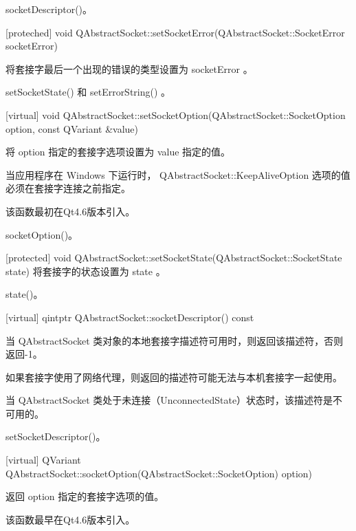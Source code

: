 \begin{notice}[另请查阅]
socketDescriptor()。
\end{notice}


[proteched] void
QAbstractSocket::setSocketError(QAbstractSocket::SocketError
socketError)

将套接字最后一个出现的错误的类型设置为 socketError 。


\begin{notice}[另请查阅]
setSocketState() 和 setErrorString() 。
\end{notice}

[virtual] void
QAbstractSocket::setSocketOption(QAbstractSocket::SocketOption option,
const QVariant \&value)

将 option 指定的套接字选项设置为 value 指定的值。

\begin{notice}
当应用程序在 Windows 下运行时， QAbstractSocket::KeepAliveOption 选项的值必须在套接字连接之前指定。
\end{notice}

该函数最初在Qt4.6版本引入。


\begin{notice}[另请查阅]
socketOption()。
\end{notice}

[protected] void QAbstractSocket::setSocketState(QAbstractSocket::SocketState state)
将套接字的状态设置为 state 。


\begin{notice}[另请查阅]
state()。
\end{notice}

[virtual] qintptr QAbstractSocket::socketDescriptor() const

当 QAbstractSocket 类对象的本地套接字描述符可用时，则返回该描述符，否则返回-1。

如果套接字使用了网络代理，则返回的描述符可能无法与本机套接字一起使用。

当 QAbstractSocket 类处于未连接（UnconnectedState）状态时，该描述符是不可用的。


\begin{notice}[另请查阅]
setSocketDescriptor()。
\end{notice}


[virtual] QVariant
QAbstractSocket::socketOption(QAbstractSocket::SocketOption) option)

返回 option 指定的套接字选项的值。

该函数最早在Qt4.6版本引入。



